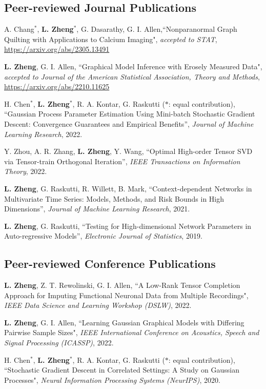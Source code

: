\documentclass[letterpaper,11pt]{article}
\begin{document}
	\subsection*{Peer-reviewed Journal Publications}
	\begin{etaremune}[start=9]
		\item  A. Chang$^{*}$, {\bf L. Zheng}$^{*}$, G. Dasarathy, G. I. Allen,``Nonparanormal Graph Quilting with Applications to Calcium Imaging", {\em accepted to STAT}, \href{https://arxiv.org/abs/2305.13491}{https://arxiv.org/abs/2305.13491}
		\item {\bf L. Zheng}, G. I. Allen, ``Graphical Model Inference with Erosely Measured Data", {\em accepted to Journal of the American Statistical Association, Theory and Methods}, \href{https://arxiv.org/abs/2210.11625}{https://arxiv.org/abs/2210.11625}
		\item H. Chen$^{*}$, {\bf L. Zheng}$^{*}$, R. A. Kontar, G. Raskutti ($*$: equal contribution), ``Gaussian Process Parameter Estimation Using Mini-batch Stochastic Gradient Descent: Convergence Guarantees and Empirical Benefits'', {\em Journal of Machine Learning Research}, 2022.
		\item Y. Zhou, A. R. Zhang, {\bf L. Zheng}, Y. Wang, ``Optimal High-order Tensor SVD via Tensor-train Orthogonal
		Iteration'', {\em  IEEE Transactions on Information Theory}, 2022.
		\item {\bf L. Zheng}, G. Raskutti, R. Willett, B. Mark, ``Context-dependent Networks in Multivariate Time Series: Models, Methods, and Risk Bounds in High Dimensions'', {\em Journal of Machine Learning Research}, 2021.
		\item {\bf L. Zheng}, G. Raskutti, ``Testing for High-dimensional Network Parameters in Auto-regressive Models'', {\em Electronic Journal of Statistics}, 2019.
	\end{etaremune}
	\subsection*{Peer-reviewed Conference Publications}
\begin{etaremune}[start=3]
	\item {\bf L. Zheng}, Z. T. Rewolinski, G. I. Allen, ``A Low-Rank Tensor Completion Approach for Imputing Functional Neuronal Data from Multiple Recordings", {\em IEEE Data Science and Learning Workshop (DSLW)}, 2022.
	\item {\bf L. Zheng}, G. I. Allen, ``Learning Gaussian Graphical Models with Differing Pairwise Sample Sizes", {\em IEEE International Conference on Acoustics, Speech and Signal Processing (ICASSP)}, 2022.
	\item  H. Chen$^{*}$, {\bf L. Zheng}$^{*}$, R. A. Kontar, G. Raskutti ($*$: equal contribution), ``Stochastic Gradient Descent in Correlated Settings: A Study on Gaussian Processes", {\em Neural Information Processing Systems (NeurIPS)}, 2020.
\end{etaremune}
\end{document}
